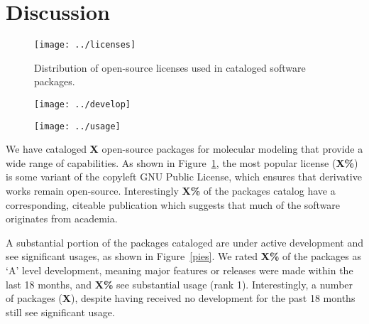 \section{Discussion}

\begin{figure}
\centering 
\texttt{[image: ../licenses]}
\caption{\label{licenses} Distribution of open-source licenses used in cataloged software packages.}
\end{figure}

\begin{figure*}
\centering
\begin{subfigure}[t]{.4\linewidth}
\centering \label{develop}
\texttt{[image: ../develop]}
\end{subfigure}
\hfill
\begin{subfigure}[t]{.4\linewidth}
\centering \label{usage}
\texttt{[image: ../usage]}
\end{subfigure}
\caption{\label{pies} Activity distributions of cataloged software packages.
 Distribution of development activity.  Distribution of user activity.
}
\end{figure*}

We have cataloged \textbf{X} open-source packages for molecular modeling that provide a wide range of capabilities.  As shown in Figure~\ref{licenses}, the most popular license (\textbf{X\%}) is some variant of the copyleft GNU Public License, which ensures that derivative works remain open-source.  Interestingly \textbf{X\%} of the packages catalog have a corresponding, citeable publication which suggests that much of the software originates from academia.   

A substantial portion of the packages cataloged are under active development and see significant usages, as shown in Figure~\ref{pies}.  We rated \textbf{X\%} of the packages as `A' level development, meaning major features or releases were made within the last 18 months, and \textbf{X\%} see substantial usage (rank 1).  Interestingly, a number of packages (\textbf{X}), despite having received no development for the past 18 months still see significant usage.  